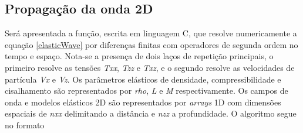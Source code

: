 \documentclass[
	12pt,				%
	openright,			%
	oneside,			%
	a4paper,			%
	english,			%
	brazil				%
	]{abntex2}
\begin{document}
\begin{apendicesenv}

    \partapendices

	\chapter{Propagação da onda 2D}
	
	Será apresentada a função, escrita em linguagem C, que resolve numericamente a equação \ref{elasticWave} por diferenças finitas com operadores de segunda ordem no tempo e espaço. Nota-se a presença de dois laços de repetição principais, o primeiro resolve as tensões \textit{Txx}, \textit{Tzz} e \textit{Txz}, e o segundo resolve as velocidades de partícula \textit{Vx} e \textit{Vz}. Os parâmetros elásticos de densidade, compressibilidade e cisalhamento são representados por \textit{rho}, \textit{L} e \textit{M} respectivamente. Os campos de onda e modelos elásticos 2D são representados por \textit{arrays} 1D com dimensões espaciais de \textit{nxx} delimitando a distância e \textit{nzz} a profundidade. O algoritmo segue no formato  
	\newline	
		
	
	
\end{apendicesenv}

%
%

\printindex
\end{document}
